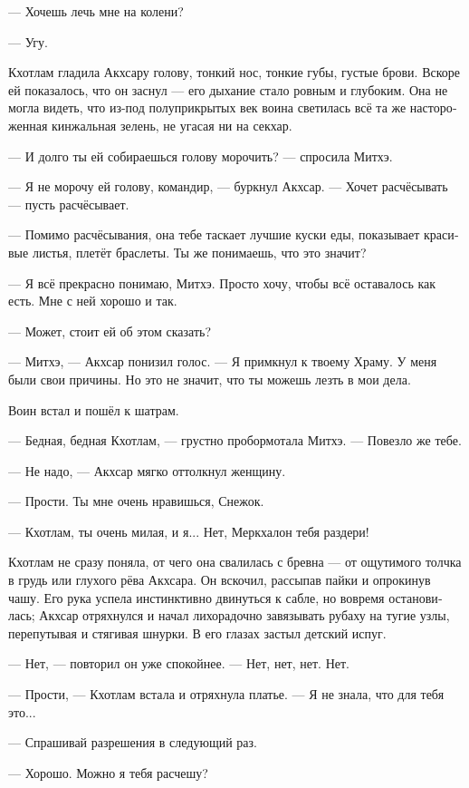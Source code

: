 \documentclass[a4paper,12pt,fleqn]{book}\usepackage{cooltooltips}\usepackage{polyglossia}\setdefaultlanguage{russian}\setotherlanguage{english}\defaultfontfeatures{Ligatures=TeX,Mapping=tex-text} \usepackage{xcolor}\definecolor{lightgray}{HTML}{bbbbbb}\color{lightgray}\newcommand{\ml}[3]{\textenglish{\textcolor{black}{#3}}}
\newcommand{\asterism}{\vspace{1em}{\centering\Large\bfseries$\ast~\ast~\ast$\par}\vspace{1em}}
\begin{document}
--- Хочешь лечь мне на колени?

--- Угу.

Кхотлам гладила Акхсару голову, тонкий нос, тонкие губы, густые брови.
Вскоре ей показалось, что он заснул --- его дыхание стало ровным и глубоким.
Она не могла видеть, что из-под полуприкрытых век воина светилась всё та же настороженная кинжальная зелень, не угасая ни на секхар.

\asterism

--- И долго ты ей собираешься голову морочить? --- спросила Митхэ.

--- Я не морочу ей голову, командир, --- буркнул Акхсар.
--- Хочет расчёсывать --- пусть расчёсывает.

--- Помимо расчёсывания, она тебе таскает лучшие куски еды, показывает красивые листья, плетёт браслеты.
Ты же понимаешь, что это значит?

--- Я всё прекрасно понимаю, Митхэ.
Просто хочу, чтобы всё оставалось как есть.
Мне с ней хорошо и так.

--- Может, стоит ей об этом сказать?

--- Митхэ, --- Акхсар понизил голос.
--- Я примкнул к твоему Храму.
У меня были свои причины.
Но это не значит, что ты можешь лезть в мои дела.

Воин встал и пошёл к шатрам.

--- Бедная, бедная Кхотлам, --- грустно пробормотала Митхэ.
--- Повезло же тебе.

\asterism

--- Не надо, --- Акхсар мягко оттолкнул женщину.

--- Прости.
Ты мне очень нравишься, Снежок.

--- Кхотлам, ты очень милая, и я...
Нет, Меркхалон тебя раздери!

Кхотлам не сразу поняла, от чего она свалилась с бревна --- от ощутимого толчка в грудь или глухого рёва Акхсара.
Он вскочил, рассыпав пайки и опрокинув чашу.
Его рука успела инстинктивно двинуться к сабле, но вовремя остановилась;
Акхсар отряхнулся и начал лихорадочно завязывать рубаху на тугие узлы, перепутывая и стягивая шнурки.
В его глазах застыл детский испуг.

--- Нет, --- повторил он уже спокойнее.
--- Нет, нет, нет.
Нет.

--- Прости, --- Кхотлам встала и отряхнула платье.
--- Я не знала, что для тебя это...

--- Спрашивай разрешения в следующий раз.

--- Хорошо.
Можно я тебя расчешу?
\end{document}
